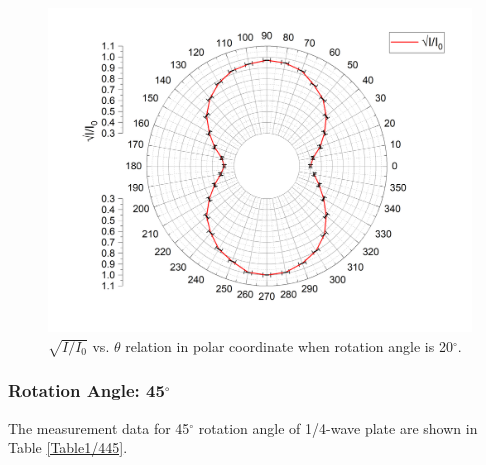 \documentclass{article}
\begin{document}
\begin{figure}[H]\centering
\includegraphics[scale=0.6]{4.png}
\caption{$\sqrt{I/I_0}$ vs. $\theta$ relation in polar coordinate when rotation angle is 20$^\circ$.}\label{Fig20}
\end{figure}


\newpage

\subsubsection{Rotation Angle: 45$^\circ$}

The measurement data for 45$^\circ$ rotation angle of 1/4-wave plate are shown in Table \ref{Table1/445}.  
\end{document}
